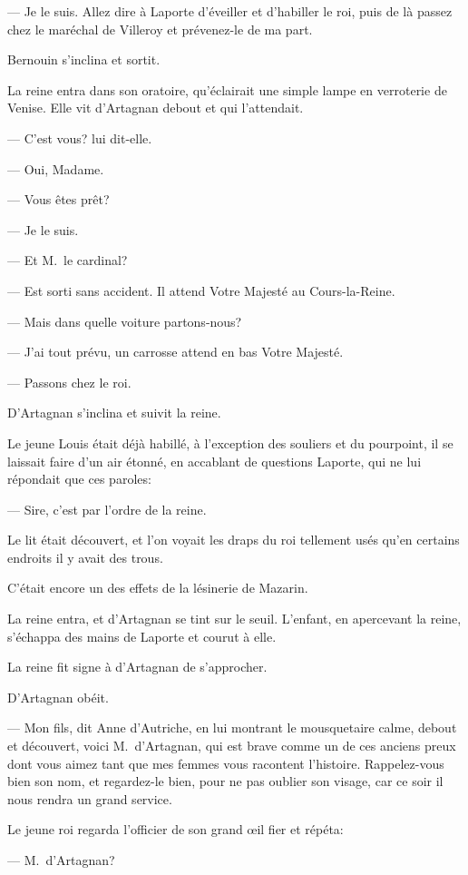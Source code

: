 — Je le suis. Allez dire à Laporte d'éveiller et d'habiller le roi, puis de là passez chez le maréchal de Villeroy et prévenez-le de ma part.

Bernouin s'inclina et sortit.

La reine entra dans son oratoire, qu'éclairait une simple lampe en verroterie de Venise. Elle vit d'Artagnan debout et qui l'attendait.

— C'est vous? lui dit-elle.

— Oui, Madame.

— Vous êtes prêt?

— Je le suis.

— Et M.~le cardinal?

— Est sorti sans accident. Il attend Votre Majesté au Cours-la-Reine.

— Mais dans quelle voiture partons-nous?

— J'ai tout prévu, un carrosse attend en bas Votre Majesté.

— Passons chez le roi.

D'Artagnan s'inclina et suivit la reine.

Le jeune Louis était déjà habillé, à l'exception des souliers et du pourpoint, il se laissait faire d'un air étonné, en accablant de questions Laporte, qui ne lui répondait que ces paroles:

— Sire, c'est par l'ordre de la reine.

Le lit était découvert, et l'on voyait les draps du roi tellement usés qu'en certains endroits il y avait des trous.

C'était encore un des effets de la lésinerie de Mazarin.

La reine entra, et d'Artagnan se tint sur le seuil. L'enfant, en apercevant la reine, s'échappa des mains de Laporte et courut à elle.

La reine fit signe à d'Artagnan de s'approcher.

D'Artagnan obéit.

— Mon fils, dit Anne d'Autriche, en lui montrant le mousquetaire calme, debout et découvert, voici M.~d'Artagnan, qui est brave comme un de ces anciens preux dont vous aimez tant que mes femmes vous racontent l'histoire. Rappelez-vous bien son nom, et regardez-le bien, pour ne pas oublier son visage, car ce soir il nous rendra un grand service.

Le jeune roi regarda l'officier de son grand œil fier et répéta:

— M.~d'Artagnan?

